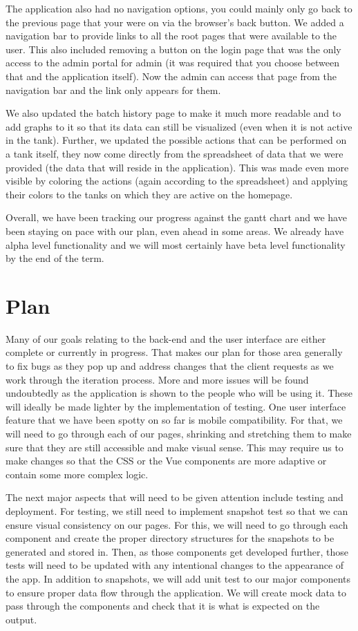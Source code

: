\documentclass[draftclsnofoot,onecolumn,journal,letterpaper,compsoc,10pt]{IEEEtran}
\begin{document}
The application also had no navigation options, you could mainly only go back to the previous page that your were on via the browser's back button.  We added a navigation bar to provide links to all the root pages that were available to the user.  This also included removing a button on the login page that was the only access to the admin portal for admin (it was required that you choose between that and the application itself).  Now the admin can access that page from the navigation bar and the link only appears for them.

We also updated the batch history page to make it much more readable and to add graphs to it so that its data can still be visualized (even when it is not active in the tank).  Further, we updated the possible actions that can be performed on a tank itself, they now come directly from the spreadsheet of data that we were provided (the data that will reside in the application).  This was made even more visible by coloring the actions (again according to the spreadsheet) and applying their colors to the tanks on which they are active on the homepage.

Overall, we have been tracking our progress against the gantt chart and we have been staying on pace with our plan, even ahead in some areas.  We already have alpha level functionality and we will most certainly have beta level functionality by the end of the term.

\section{Plan}
Many of our goals relating to the back-end and the user interface are either complete or currently in progress. That makes our plan for those area generally to fix bugs as they pop up and address changes that the client requests as we work through the iteration process. More and more issues will be found undoubtedly as the application is shown to the people who will be using it. These will ideally be made lighter by the implementation of testing. One user interface feature that we have been spotty on so far is mobile compatibility. For that, we will need to go through each of our pages, shrinking and stretching them to make sure that they are still accessible and make visual sense. This may require us to make changes so that the CSS or the Vue components are more adaptive or contain some more complex logic.

The next major aspects that will need to be given attention include testing and deployment. For testing, we still need to implement snapshot test so that we can ensure visual consistency on our pages. For this, we will need to go through each component and create the proper directory structures for the snapshots to be generated and stored in. Then, as those components get developed further, those tests will need to be updated with any intentional changes to the appearance of the app. In addition to snapshots, we will add unit test to our major components to ensure proper data flow through the application. We will create mock data to pass through the components and check that it is what is expected on the output.
\end{document}
